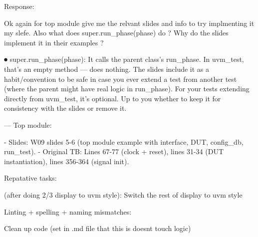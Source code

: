 \documentclass[a4paper,11pt]{article}
\begin{document}
Response:

  Ok again for top module give me the relvant slides and info to try        
  implmenting it my slefe. Also  what does super.run_phase(phase) do ? Why do 
 the slides implement it in their examples ?                                
                                                                            
⏺ super.run_phase(phase): It calls the parent class's run_phase. In         
  uvm_test, that's an empty method — does nothing. The slides include it as
  a habit/convention to be safe in case you ever extend a test from another 
  test (where the parent might have real logic in run_phase). For your tests
   extending directly from uvm_test, it's optional. Up to you whether to    
  keep it for consistency with the slides or remove it.
                          
  ---                                            
  Top module:
             
  - Slides: W09 slides 5-6 (top module example with interface, DUT,
  config_db, run_test).                                                     
  - Original TB: Lines 67-77 (clock + reset), lines 31-34 (DUT
  instantiation), lines 356-364 (signal init).                              
                             


Repatative tasks: 

(after doing 2/3 display to uvm style):
Switch the rest of display to uvm style 


Linting + spelling + naming mismatches:

Clean up code (set in .md file that this is doesnt touch logic)

  
\end{document}
